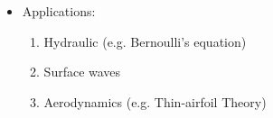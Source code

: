 \begin{itemize}
\begin{enumerate}[label = <\roman*>]
\begin{enumerate}[label = (\alph*)]
\begin{enumerate}[label = \protect\circled{\arabic*}]
\begin{equation}
\eqref{eq: 1-6}\Longrightarrow
\boxed{
\frac{\Delta\rho}{\rho_\infty}\sim\frac{M_\infty^2}{2}
}
\label{eq: 1-7}
\end{equation}
\begin{align*}
\frac{\Delta\rho}{\rho_\infty}< 5\% \text{ if }\boxed{M_\infty< 0.3}
\end{align*}
\end{enumerate}
\end{enumerate}
\end{enumerate}
$
\left.
\begin{aligned}
&\ref{1.1-1} \\
&\ref{1.1-2}
\end{aligned}
\right\}
\Longrightarrow$
In general, the flow can be treated as incompressible if $M_\infty <0.3\%$.

Combine \ref{1-1-i} and \ref{1-1-ii}, the flow can be treated as an Ideal flow if 
$\left\{
\begin{aligned}
&Re \gg 1\\
&M < 0
\end{aligned}\right.$\\
except region
$\left\{
\begin{aligned}
&\text{Boundary layer} (BL)\\
&\text{Wake} \\
&\text{shock}
\end{aligned}\right.
$
\item Applications: 
\begin{enumerate}[label = \protect\circled{\arabic*}]
\item Hydraulic (e.g. Bernoulli's equation) \\
\item Surface waves
\item Aerodynamics (e.g. Thin-airfoil Theory)
\end{enumerate}
\end{itemize}
